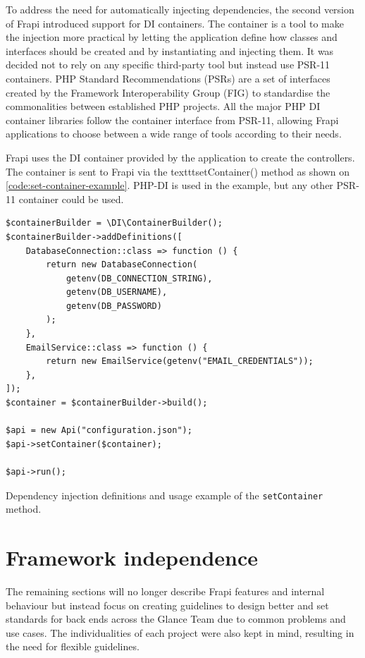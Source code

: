 To address the need for automatically injecting dependencies, the second version of Frapi introduced support for DI containers. The container is a tool to make the injection more practical by letting the application define how classes and interfaces should be created and by instantiating and injecting them. It was decided not to rely on any specific third-party tool but instead use PSR-11 \cite{psr-11} containers. PHP Standard Recommendations (PSRs) are a set of interfaces created by the Framework Interoperability Group (FIG) \cite{fig-website} to standardise the commonalities between established PHP projects. All the major PHP DI container libraries follow the container interface from PSR-11, allowing Frapi applications to choose between a wide range of tools according to their needs.

Frapi uses the DI container provided by the application to create the controllers. The container is sent to Frapi via the texttt{setContainer()} method as shown on \autoref{code:set-container-example}. PHP-DI \cite{php-di} is used in the example, but any other PSR-11 container could be used.

\begin{listing}[htbp]
\begin{verbatim}
$containerBuilder = \DI\ContainerBuilder();
$containerBuilder->addDefinitions([
	DatabaseConnection::class => function () {
		return new DatabaseConnection(
			getenv(DB_CONNECTION_STRING),
			getenv(DB_USERNAME),
			getenv(DB_PASSWORD)
		);
	},
	EmailService::class => function () {
		return new EmailService(getenv("EMAIL_CREDENTIALS"));
	},
]);
$container = $containerBuilder->build();

$api = new Api("configuration.json");
$api->setContainer($container);

$api->run();
\end{verbatim}
\caption{Dependency injection definitions and usage example of the \texttt{setContainer} method.}
\label{code:set-container-example}
\end{listing}

\section{Framework independence}

The remaining sections will no longer describe Frapi features and internal behaviour but instead focus on creating guidelines to design better and set standards for back ends across the Glance Team due to common problems and use cases. The individualities of each project were also kept in mind, resulting in the need for flexible guidelines.

